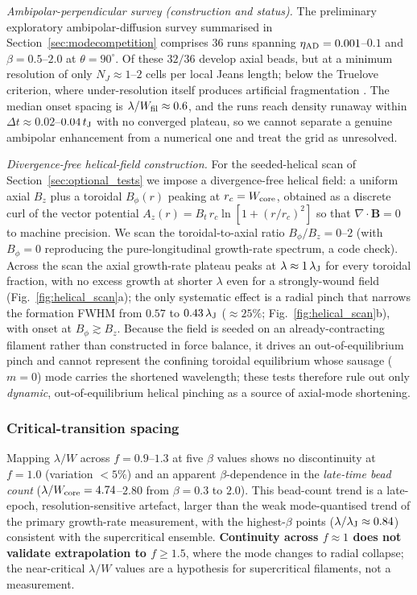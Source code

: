 \documentclass[usenatbib,twoside,twocolumn]{mnras}
\begin{document}
\smallskip\noindent\emph{Ambipolar-perpendicular survey (construction and status).} The preliminary exploratory ambipolar-diffusion survey summarised in Section~\ref{sec:modecompetition} comprises 36 runs spanning $\eta_{\rm AD}=0.001$--$0.1$ and $\beta=0.5$--$2.0$ at $\theta=90^\circ$. Of these $32/36$ develop axial beads, but at a minimum resolution of only $N_J\approx1$--$2$ cells per local Jeans length; below the Truelove criterion, where under-resolution itself produces artificial fragmentation \citep{Truelove1997}. The median onset spacing is $\lambda/W_{\rm fil}\approx0.6$, and the runs reach density runaway within $\Delta t\approx0.02$--$0.04\,t_{\rm J}$ with no converged plateau, so we cannot separate a genuine ambipolar enhancement from a numerical one and treat the grid as unresolved.

\smallskip\noindent\emph{Divergence-free helical-field construction.} For the seeded-helical scan of Section~\ref{sec:optional_tests} we impose a divergence-free helical field: a uniform axial $B_z$ plus a toroidal $B_\phi(r)$ peaking at $r_c=W_{\rm core}$, obtained as a discrete curl of the vector potential $A_z(r)=B_t\,r_c\ln[1+(r/r_c)^2]$ so that $\nabla\!\cdot\!\mathbf{B}=0$ to machine precision. We scan the toroidal-to-axial ratio $B_\phi/B_z=0$--$2$ (with $B_\phi=0$ reproducing the pure-longitudinal growth-rate spectrum, a code check). Across the scan the axial growth-rate plateau peaks at $\lambda\approx1\,\lambda_{\rm J}$ for every toroidal fraction, with no excess growth at shorter $\lambda$ even for a strongly-wound field (Fig.~\ref{fig:helical_scan}a); the only systematic effect is a radial pinch that narrows the formation FWHM from $0.57$ to $0.43\,\lambda_{\rm J}$ ($\approx25\%$; Fig.~\ref{fig:helical_scan}b), with onset at $B_\phi\gtrsim B_z$. Because the field is seeded on an already-contracting filament rather than constructed in force balance, it drives an out-of-equilibrium pinch and cannot represent the confining toroidal equilibrium whose sausage ($m=0$) mode carries the shortened \citet{Fiege2000} wavelength; these tests therefore rule out only \emph{dynamic}, out-of-equilibrium helical pinching as a source of axial-mode shortening.

\subsubsection{Critical-transition spacing}

Mapping $\lambda/W$ across $f=0.9$--$1.3$ at five $\beta$ values shows no discontinuity at $f=1.0$ (variation $<5\%$) and an apparent $\beta$-dependence in the \emph{late-time bead count} ($\lambda/W_{\rm core}=4.74$--$2.80$ from $\beta=0.3$ to $2.0$). This bead-count trend is a late-epoch, resolution-sensitive artefact, larger than the weak mode-quantised trend of the primary growth-rate measurement, with the highest-$\beta$ points ($\lambda/\lambda_{\rm J}\approx0.84$) consistent with the supercritical ensemble. \textbf{Continuity across $f\approx1$ does not validate extrapolation to $f\geq1.5$}, where the mode changes to radial collapse; the near-critical $\lambda/W$ values are a hypothesis for supercritical filaments, not a measurement.
\end{document}
